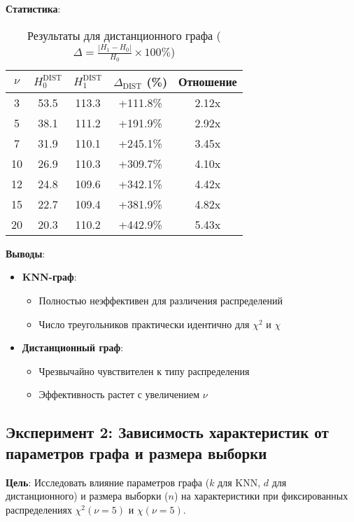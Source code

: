 \documentclass[a4paper, 12pt]{article}
\begin{document}
\textbf{Статистика}:
\begin{table}[H]
    \centering
    \begin{tabular}{|c|c|c|c|c|}
        \hline
        $\nu$ & $H_0^{\text{DIST}}$ & $H_1^{\text{DIST}}$ & $\Delta_{\text{DIST}}$ (\%) & Отношение \\ \hline
        3 & 53.5 & 113.3 & +111.8\% & 2.12x \\ 
        5 & 38.1 & 111.2 & +191.9\% & 2.92x \\ 
        7 & 31.9 & 110.1 & +245.1\% & 3.45x \\ 
        10 & 26.9 & 110.3 & +309.7\% & 4.10x \\ 
        12 & 24.8 & 109.6 & +342.1\% & 4.42x \\ 
        15 & 22.7 & 109.4 & +381.9\% & 4.82x \\ 
        20 & 20.3 & 110.2 & +442.9\% & 5.43x \\ \hline
    \end{tabular}
    \caption{Результаты для дистанционного графа ($\Delta = \frac{|H_1 - H_0|}{H_0} \times 100\%$)}
    \label{tab:exp1}
\end{table}

\textbf{Выводы}:
\begin{itemize}
    \item \textbf{KNN-граф}:
        \begin{itemize}
            \item Полностью неэффективен для различения распределений
            \item Число треугольников практически идентично для $\chi^2$ и $\chi$
        \end{itemize}
    
    \item \textbf{Дистанционный граф}:
        \begin{itemize}
            \item Чрезвычайно чувствителен к типу распределения
            \item Эффективность растет с увеличением $\nu$
        \end{itemize}
\end{itemize}

\subsection{Эксперимент 2: Зависимость характеристик от параметров графа и размера выборки}
\label{exp2}

\textbf{Цель}: Исследовать влияние параметров графа (\(k\) для KNN, \(d\) для дистанционного) и размера выборки (\(n\)) на характеристики при фиксированных распределениях \(\chi^2(\nu=5)\) и \(\chi(\nu=5)\).
\end{document}
